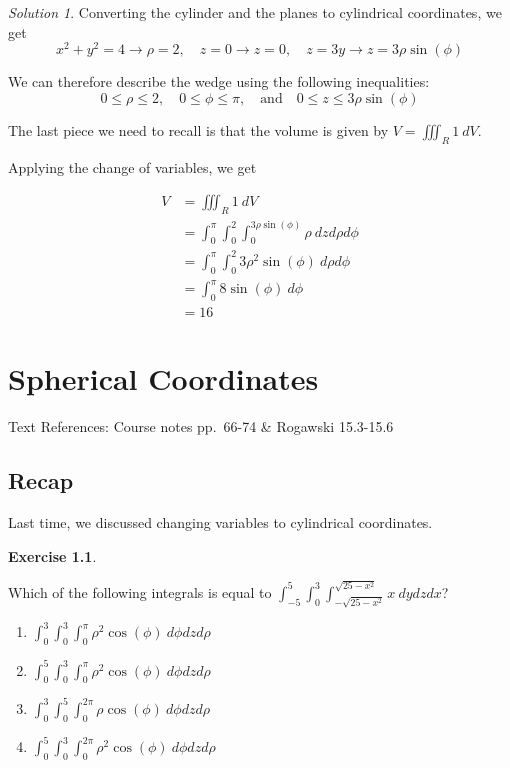 \documentclass[
]{book}
\providecommand{\tightlist}{%
  \setlength{\itemsep}{0pt}\setlength{\parskip}{0pt}}
\theoremstyle{definition}
\theoremstyle{definition}
\theoremstyle{definition}
\newtheorem{exercise}{Exercise}[chapter]
\theoremstyle{definition}
\theoremstyle{remark}
\newtheorem*{solution}{Solution}
\begin{document}
\begin{solution}

Converting the cylinder and the planes to cylindrical coordinates, we get \[x^2+y^2=4 \to \rho=2, \quad z=0 \to z=0, \quad z=3y\to z=3\rho\sin(\phi) \]

We can therefore describe the wedge using the following inequalities: \[0\leq \rho\leq 2, \quad 0\leq \phi\leq \pi,\quad \mbox{and}\quad 0\leq z \leq 3\rho\sin(\phi)\]

The last piece we need to recall is that the volume is given by \(\displaystyle V=\iiint_R 1~dV\).

Applying the change of variables, we get

\begin{align*}
V & =\iiint_R 1~dV\\
&= \int_0^{\pi}\int_0^2\int_0^{3\rho\sin (\phi)} \rho~dzd\rho d\phi\\
&= \int_0^{\pi}\int_0^2 3\rho^2\sin(\phi)~d\rho d\phi\\
&= \int_0^{\pi} 8\sin(\phi)~d\phi \\
&= 16
\end{align*}

\end{solution}

\hypertarget{lec-17}{%
\chapter{Spherical Coordinates}\label{lec-17}}

Text References: Course notes pp.~66-74 \& Rogawski 15.3-15.6

\hypertarget{recap-15}{%
\section{Recap}\label{recap-15}}

Last time, we discussed changing variables to cylindrical coordinates.

\begin{exercise}
\protect\hypertarget{exr:unlabeled-div-126}{}\label{exr:unlabeled-div-126}

Which of the following integrals is equal to \(\displaystyle \int_{-5}^5 \int_0^3\int_{-\sqrt{25-x^2}}^{\sqrt{25-x^2}} x~dydzdx\)?

\begin{enumerate}
\def\labelenumi{\alph{enumi}.}
\tightlist
\item
  \(\displaystyle \int_{0}^3 \int_0^3\int_{0}^{\pi} \rho^2\cos(\phi)~d\phi dzd\rho\)
\item
  \(\displaystyle \int_{0}^5 \int_0^3\int_{0}^{\pi} \rho^2\cos(\phi)~d\phi dzd\rho\)
\item
  \(\displaystyle \int_{0}^3 \int_0^5\int_{0}^{2\pi} \rho\cos(\phi)~d\phi dzd\rho\)
\item
  \(\displaystyle \int_{0}^5 \int_0^3\int_{0}^{2\pi} \rho^2\cos(\phi)~d\phi dzd\rho\)
\end{enumerate}

\end{exercise}
\end{document}
